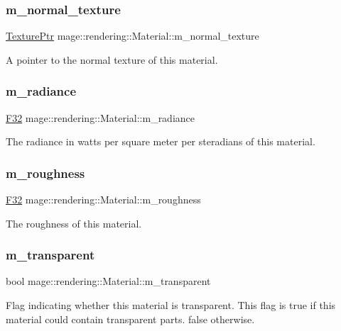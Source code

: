 \subsubsection{\texorpdfstring{m\+\_\+normal\+\_\+texture}{m\_normal\_texture}}
{\footnotesize\ttfamily \hyperlink{namespacemage_1_1rendering_a6f3ae54f825328465b0cdde0f0de4a36}{Texture\+Ptr} mage\+::rendering\+::\+Material\+::m\+\_\+normal\+\_\+texture\hspace{0.3cm}{\ttfamily [private]}}

A pointer to the normal texture of this material. \hypertarget{classmage_1_1rendering_1_1_material_ac79fc4d9a669a552d7319ae713f25871}{}\label{classmage_1_1rendering_1_1_material_ac79fc4d9a669a552d7319ae713f25871} 
\subsubsection{\texorpdfstring{m\+\_\+radiance}{m\_radiance}}
{\footnotesize\ttfamily \hyperlink{namespacemage_aa97e833b45f06d60a0a9c4fc22ae02c0}{F32} mage\+::rendering\+::\+Material\+::m\+\_\+radiance\hspace{0.3cm}{\ttfamily [private]}}

The radiance in watts per square meter per steradians of this material. \hypertarget{classmage_1_1rendering_1_1_material_a14b420a0bdb8cb1f0fa57aa31bd09ae1}{}\label{classmage_1_1rendering_1_1_material_a14b420a0bdb8cb1f0fa57aa31bd09ae1} 
\subsubsection{\texorpdfstring{m\+\_\+roughness}{m\_roughness}}
{\footnotesize\ttfamily \hyperlink{namespacemage_aa97e833b45f06d60a0a9c4fc22ae02c0}{F32} mage\+::rendering\+::\+Material\+::m\+\_\+roughness\hspace{0.3cm}{\ttfamily [private]}}

The roughness of this material. \hypertarget{classmage_1_1rendering_1_1_material_af9f8d0fdb613bce1a4c3683836649bf3}{}\label{classmage_1_1rendering_1_1_material_af9f8d0fdb613bce1a4c3683836649bf3} 
\subsubsection{\texorpdfstring{m\+\_\+transparent}{m\_transparent}}
{\footnotesize\ttfamily bool mage\+::rendering\+::\+Material\+::m\+\_\+transparent\hspace{0.3cm}{\ttfamily [private]}}

Flag indicating whether this material is transparent. This flag is {\ttfamily true} if this material could contain transparent parts. {\ttfamily false} otherwise. 